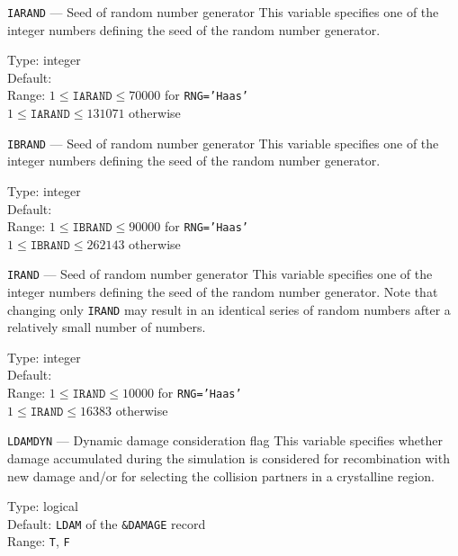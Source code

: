 \begin{keydescription}{\texttt{IARAND} --- Seed of random number generator}
%
  This variable specifies one of the integer numbers defining the seed of
  the random number generator.
%
  \begin{keytab}
    Type:    \> integer \\
    Default:  \\
    Range:   \> $1 \le \texttt{IARAND} \le 70000$ for \texttt{RNG='Haas'} \\
             \> $1 \le \texttt{IARAND} \le 131071$ otherwise
  \end{keytab}
\end{keydescription}

\begin{keydescription}{\texttt{IBRAND} --- Seed of random number generator}
%
  This variable specifies one of the integer numbers defining the seed of
  the random number generator.
%
  \begin{keytab}
    Type:    \> integer \\
    Default:  \\
    Range:   \> $1 \le \texttt{IBRAND} \le 90000$ for \texttt{RNG='Haas'} \\
             \> $1 \le \texttt{IBRAND} \le 262143$ otherwise
  \end{keytab}
\end{keydescription}

\begin{keydescription}{\texttt{IRAND} --- Seed of random number generator}
%
  This variable specifies one of the integer numbers defining the seed of
  the random number generator. Note that changing only \texttt{IRAND}
  may result in an identical series of random numbers after a
  relatively small number of numbers. 
%
  \begin{keytab}
    Type:    \> integer \\
    Default:  \\
    Range:   \> $1 \le \texttt{IRAND} \le 10000$ for \texttt{RNG='Haas'} \\
             \> $1 \le \texttt{IRAND} \le 16383$ otherwise
  \end{keytab}
\end{keydescription}

\begin{keydescription}{\texttt{LDAMDYN} --- Dynamic damage consideration flag}
%
  This variable specifies whether damage accumulated during the simulation is
  considered for recombination with new damage and/or for selecting the
  collision partners in a crystalline region.
%
  \begin{keytab}
    Type:    \> logical \\
    Default: \> \texttt{LDAM} of the \texttt{\&DAMAGE} record \\
    Range:   \> \texttt{T}, \texttt{F}
  \end{keytab}
\end{keydescription}

